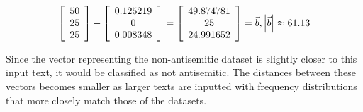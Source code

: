 \documentclass{article}
\begin{document}
\[
\left[ {\begin{array}{c}
    50\\
    25\\
    25\\
  \end{array} } \right] - \left[ {\begin{array}{c}
    0.125219\\
    0\\
    0.008348\\
  \end{array} } \right] = \left[ {\begin{array}{c}
    49.874781\\
    25\\
    24.991652\\
  \end{array} } \right] = \vec{b},\hfill \left| \vec{b} \right| \approx 61.13
\]

Since the vector representing the non-antisemitic dataset is slightly closer to this input text, it would be classified as not antisemitic. The distances between these vectors becomes smaller as larger texts are inputted with frequency distributions that more closely match those of the datasets.
\end{document}
